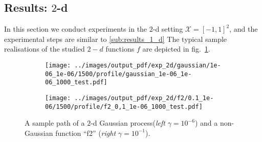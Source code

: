 \documentclass[10pt, conference, compsocconf]{IEEEtran}
\newcommand{\Xcal}{\mathcal{X}}
\begin{document}

\subsection{Results: $2$-d} %
\label{sub:results_2_d}

In this section we conduct experiments in the $2$-d setting $\Xcal=[-1,1]^2$, and
the experimental steps are similar to \ref{sub:results_1_d} The typical sample realisations
of the studied $2-d$ functions $f$ are depicted in fig.~\ref{fig:2d_profile}.
\begin{figure}%
  \centering
  \begin{subfigure}[b]{0.5\linewidth}
    \texttt{[image: ../images/output\_pdf/exp\_2d/gaussian/1e-06\_1e-06/1500/profile/gaussian\_1e-06\_1e-06\_1000\_test.pdf]}
  \end{subfigure}%
  \begin{subfigure}[b]{0.5\linewidth}
    \texttt{[image: ../images/output\_pdf/exp\_2d/f2/0.1\_1e-06/1500/profile/f2\_0,1\_1e-06\_1000\_test.pdf]}
  \end{subfigure}
  \caption{A sample path of a $2$-d Gaussian process(\textit{left} $\gamma=10^{-6}$)
  and a non-Gaussian function ``f2'' (\textit{right} $\gamma=10^{-1}$).}
  \label{fig:2d_profile}
\end{figure}
\end{document}
